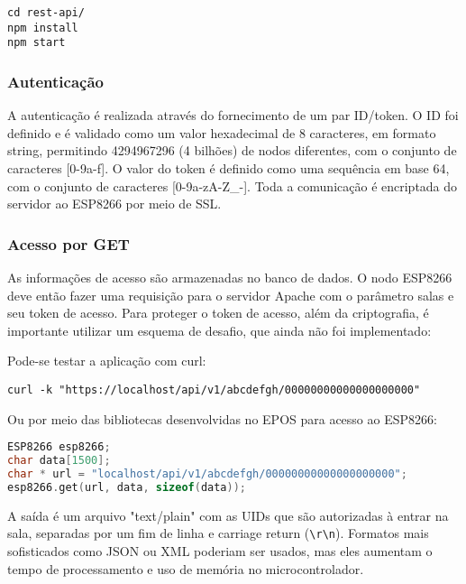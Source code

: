\documentclass[11pt]{article}
\begin{document}
\begin{lstlisting}
cd rest-api/
npm install
npm start
\end{lstlisting}

\subsubsection{Autenticação}

A autenticação é realizada através do fornecimento de um par ID/token. O ID foi definido e é validado como um valor hexadecimal de 8 caracteres, em formato string, permitindo 4294967296 (4 bilhões) de nodos diferentes, com o conjunto de caracteres [0-9a-f]. O valor do token é definido como uma sequência em base 64, com o conjunto de caracteres [0-9a-zA-Z\_-]. Toda a comunicação é encriptada do servidor ao ESP8266 por meio de SSL.



\subsubsection{Acesso por GET}

As informações de acesso são armazenadas no banco de dados. O nodo ESP8266 deve então fazer uma requisição para o servidor Apache com o parâmetro salas e seu token de acesso. Para proteger o token de acesso, além da criptografia, é importante utilizar um esquema de desafio, que ainda não foi implementado:



Pode-se testar a aplicação com curl:

\begin{lstlisting}
curl -k "https://localhost/api/v1/abcdefgh/00000000000000000000"
\end{lstlisting}

Ou por meio das bibliotecas desenvolvidas no EPOS para acesso ao ESP8266:

\begin{lstlisting}[language=C++]
ESP8266 esp8266;
char data[1500];
char * url = "localhost/api/v1/abcdefgh/00000000000000000000";
esp8266.get(url, data, sizeof(data));
\end{lstlisting}

A saída é um arquivo "text/plain" com as UIDs que são autorizadas à entrar na sala, separadas por um fim de linha e carriage return (\texttt{\textbackslash r\textbackslash n}). Formatos mais sofisticados como JSON ou XML poderiam ser usados, mas eles aumentam o tempo de processamento e uso de memória no microcontrolador.
\end{document}

